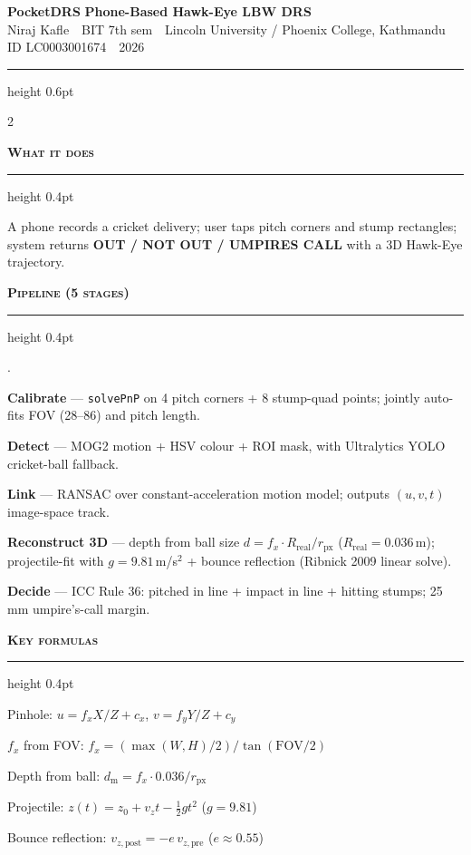 \documentclass[9pt,a4paper]{extarticle}
\newenvironment{tightitemize}{%
  \begin{list}{\textbullet}{%
    \setlength{\leftmargin}{10pt}%
    \setlength{\labelwidth}{6pt}%
    \setlength{\labelsep}{3pt}%
    \setlength{\itemsep}{0pt}%
    \setlength{\parsep}{0pt}%
    \setlength{\topsep}{1pt}%
    \setlength{\partopsep}{0pt}%
  }%
}{\end{list}}
\newcounter{tenum}
\newenvironment{tightenum}{%
  \setcounter{tenum}{0}%
  \begin{list}{\arabic{tenum}.}{%
    \usecounter{tenum}%
    \setlength{\leftmargin}{14pt}%
    \setlength{\labelwidth}{10pt}%
    \setlength{\labelsep}{3pt}%
    \setlength{\itemsep}{0pt}%
    \setlength{\parsep}{0pt}%
    \setlength{\topsep}{1pt}%
    \setlength{\partopsep}{0pt}%
  }%
}{\end{list}}
\renewcommand{\section}[1]{%
  \vspace{3pt}%
  {\color{amber}\bfseries\scshape\normalsize #1}\par
  \vspace{1pt}%
  \hrule height 0.4pt\relax
  \vspace{2pt}%
}
\newcommand{\titlestrip}{%
  \begin{center}
  {\color{amber}\bfseries\Large PocketDRS} \;{\small ---}\; {\bfseries Phone-Based Hawk-Eye LBW DRS}\\[1pt]
  {\footnotesize Niraj Kafle \,\textbullet\, BIT 7th sem \,\textbullet\, Lincoln University / Phoenix College, Kathmandu \,\textbullet\, ID LC0003001674 \,\textbullet\, 2026}
  \end{center}
  \vspace{-6pt}
  \hrule height 0.6pt\relax
  \vspace{2pt}%
}
\begin{document}
\titlestrip

\begin{multicols}{2}

\section{What it does}
A phone records a cricket delivery; user taps pitch corners and stump rectangles; system returns \textbf{OUT / NOT OUT / UMPIRES CALL} with a 3D Hawk-Eye trajectory.

\section{Pipeline (5 stages)}
\begin{tightenum}
\item \textbf{Calibrate} --- \texttt{solvePnP} on 4 pitch corners + 8 stump-quad points; jointly auto-fits FOV (28--86\textdegree) and pitch length.
\item \textbf{Detect} --- MOG2 motion + HSV colour + ROI mask, with Ultralytics YOLO cricket-ball fallback.
\item \textbf{Link} --- RANSAC over constant-acceleration motion model; outputs $(u,v,t)$ image-space track.
\item \textbf{Reconstruct 3D} --- depth from ball size $d = f_x \cdot R_{\text{real}} / r_{\text{px}}$ ($R_{\text{real}}=0.036$\,m); projectile-fit with $g=9.81$\,m/s$^2$ + bounce reflection (Ribnick 2009 linear solve).
\item \textbf{Decide} --- ICC Rule 36: pitched in line + impact in line + hitting stumps; 25\,mm umpire's-call margin.
\end{tightenum}

\section{Key formulas}
\begin{tightitemize}
\item Pinhole: $u = f_x X/Z + c_x$, \; $v = f_y Y/Z + c_y$
\item $f_x$ from FOV: $f_x = (\max(W,H)/2)/\tan(\text{FOV}/2)$
\item Depth from ball: $d_{\text{m}} = f_x \cdot 0.036 / r_{\text{px}}$
\item Projectile: $z(t) = z_0 + v_z t - \tfrac{1}{2} g t^2$ \; ($g=9.81$)
\item Bounce reflection: $v_{z,\text{post}} = -e\, v_{z,\text{pre}}$ \; ($e\approx 0.55$)
\end{tightitemize}


\end{multicols}
\end{document}
